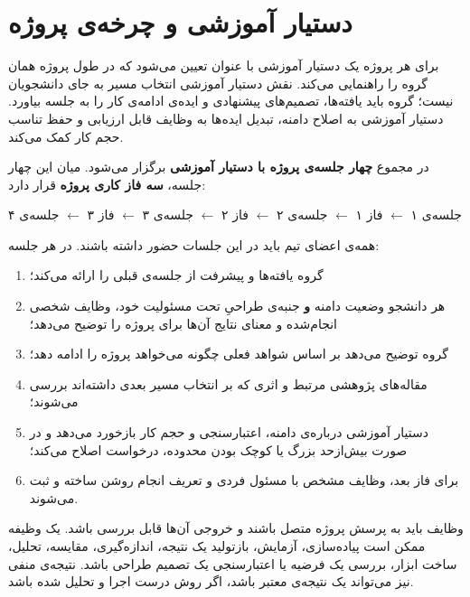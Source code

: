 \documentclass[12pt]{article}
\newcommand{\en}[1]{\lr{#1}}
\begin{document}
\section{دستیار آموزشی و چرخه‌ی پروژه}
برای هر پروژه یک دستیار آموزشی با عنوان \en{TA} تعیین می‌شود که در طول پروژه همان گروه را راهنمایی می‌کند. نقش دستیار آموزشی انتخاب مسیر به جای دانشجویان نیست؛ گروه باید یافته‌ها، تصمیم‌های پیشنهادی و ایده‌ی ادامه‌ی کار را به جلسه بیاورد. دستیار آموزشی به اصلاح دامنه، تبدیل ایده‌ها به وظایف قابل ارزیابی و حفظ تناسب حجم کار کمک می‌کند.

در مجموع \textbf{چهار جلسه‌ی پروژه با دستیار آموزشی} برگزار می‌شود. میان این چهار جلسه، \textbf{سه فاز کاری پروژه} قرار دارد:
\begin{center}
جلسه‌ی ۱ $\longleftarrow$ فاز ۱ $\longleftarrow$ جلسه‌ی ۲ $\longleftarrow$ فاز ۲ $\longleftarrow$ جلسه‌ی ۳ $\longleftarrow$ فاز ۳ $\longleftarrow$ جلسه‌ی ۴
\end{center}

همه‌ی اعضای تیم باید در این جلسات حضور داشته باشند. در هر جلسه:
\begin{enumerate}[label=\arabic*.]
    \item گروه یافته‌ها و پیشرفت از جلسه‌ی قبلی را ارائه می‌کند؛
    \item هر دانشجو وضعیت دامنه \textbf{و} جنبه‌ی طراحیِ تحت مسئولیت خود، وظایف شخصی انجام‌شده و معنای نتایج آن‌ها برای پروژه را توضیح می‌دهد؛
    \item گروه توضیح می‌دهد بر اساس شواهد فعلی چگونه می‌خواهد پروژه را ادامه دهد؛
    \item مقاله‌های پژوهشی مرتبط و اثری که بر انتخاب مسیر بعدی داشته‌اند بررسی می‌شوند؛
    \item دستیار آموزشی درباره‌ی دامنه، اعتبارسنجی و حجم کار بازخورد می‌دهد و در صورت بیش‌ازحد بزرگ یا کوچک بودن محدوده، درخواست اصلاح می‌کند؛
    \item برای فاز بعد، وظایف مشخص با مسئول فردی و تعریف انجام روشن ساخته و ثبت می‌شوند.
\end{enumerate}

وظایف باید به پرسش پروژه متصل باشند و خروجی آن‌ها قابل بررسی باشد. یک وظیفه ممکن است پیاده‌سازی، آزمایش، بازتولید یک نتیجه، اندازه‌گیری، مقایسه، تحلیل، ساخت ابزار، بررسی یک فرضیه یا اعتبارسنجی یک تصمیم طراحی باشد. نتیجه‌ی منفی نیز می‌تواند یک نتیجه‌ی معتبر باشد، اگر روش درست اجرا و تحلیل شده باشد.
\end{document}
